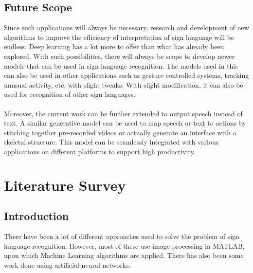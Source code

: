 \documentclass[12pt,oneside,a4paper]{article}
\begin{document}
		\subsection{Future Scope}
			Since such applications will always be necessary, research and development of new algorithms to improve the efficiency of interpretation of sign language will be endless. Deep learning has a lot more to offer than what has already been explored. With such possibilities, there will always be scope to develop newer models that can be used in sign language recognition. The models used in this can also be used in other applications such as gesture controlled systems, tracking unusual activity, etc. with slight tweaks. With slight modification, it can also be used for recognition of other sign languages. \\
			\\
			Moreover, the current work can be further extended to output speech instead of text. A similar generative model can be used to map speech or text to actions by stitching together pre-recorded videos or actually generate an interface with a skeletal structure. This model can be seamlessly integrated with various applications on different platforms to support high productivity.


	\section{Literature Survey}

		\subsection{Introduction}
			There have been a lot of different approaches used to solve the problem of sign language recognition. However, most of these use image processing in MATLAB, upon which Machine Learning algorithms are applied. There has also been some work done using artificial neural networks.
\end{document}
